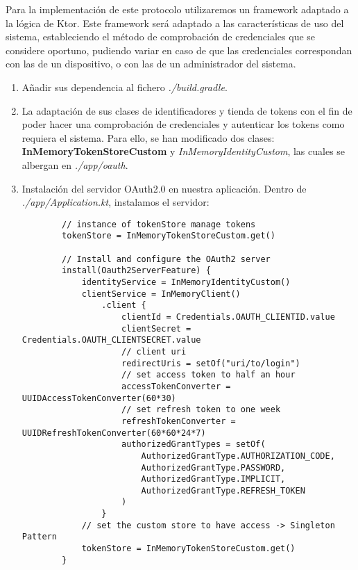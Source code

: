 Para la implementación de este protocolo utilizaremos un framework adaptado a la lógica de Ktor. 
Este framework será adaptado a las características de uso del sistema, estableciendo el método de comprobación de credenciales que se considere oportuno, pudiendo variar en caso de que las credenciales correspondan con las de un dispositivo, o con las de un administrador del sistema.

\begin{enumerate}
    \item Añadir sus dependencia al fichero \textit{./build.gradle}.
    \item La adaptación de sus clases de identificadores y tienda de tokens con el fin de poder hacer una comprobación de credenciales y autenticar los tokens como requiera el sistema. Para ello, se han modificado dos clases: \textbf{InMemoryTokenStoreCustom} y \textit{InMemoryIdentityCustom}, las cuales se albergan en \textit{./app/oauth}.
    \item Instalación del servidor OAuth2.0 en nuestra aplicación.
    Dentro de \textit{./app/Application.kt}, instalamos el servidor:

    \begin{lstlisting}
        // instance of tokenStore manage tokens
        tokenStore = InMemoryTokenStoreCustom.get()
        
        // Install and configure the OAuth2 server
        install(Oauth2ServerFeature) {
            identityService = InMemoryIdentityCustom()
            clientService = InMemoryClient()
                .client {
                    clientId = Credentials.OAUTH_CLIENTID.value
                    clientSecret = Credentials.OAUTH_CLIENTSECRET.value
                    // client uri
                    redirectUris = setOf("uri/to/login")
                    // set access token to half an hour
                    accessTokenConverter = UUIDAccessTokenConverter(60*30)
                    // set refresh token to one week
                    refreshTokenConverter = UUIDRefreshTokenConverter(60*60*24*7)
                    authorizedGrantTypes = setOf(
                        AuthorizedGrantType.AUTHORIZATION_CODE,
                        AuthorizedGrantType.PASSWORD,
                        AuthorizedGrantType.IMPLICIT,
                        AuthorizedGrantType.REFRESH_TOKEN
                    )
                }
            // set the custom store to have access -> Singleton Pattern
            tokenStore = InMemoryTokenStoreCustom.get()
        }
    \end{lstlisting}
\end{enumerate}



